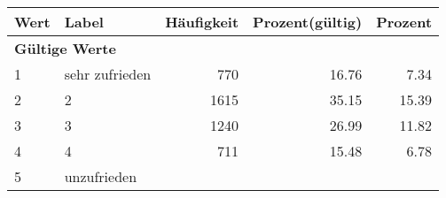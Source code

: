      \begin{longtable}{lXrrr}
     \toprule
     \textbf{Wert} & \textbf{Label} & \textbf{Häufigkeit} & \textbf{Prozent(gültig)} & \textbf{Prozent} \\
     \endhead
     \midrule
     \multicolumn{5}{l}{\textbf{Gültige Werte}}\\

     1 &
     \multicolumn{1}{X}{ sehr zufrieden   } &


       \num{770} &
       \num[round-mode=places,round-precision=2]{16.76} &
         \num[round-mode=places,round-precision=2]{7.34} \\

     2 &
     \multicolumn{1}{X}{ 2   } &


       \num{1615} &
       \num[round-mode=places,round-precision=2]{35.15} &
         \num[round-mode=places,round-precision=2]{15.39} \\

     3 &
     \multicolumn{1}{X}{ 3   } &


       \num{1240} &
       \num[round-mode=places,round-precision=2]{26.99} &
         \num[round-mode=places,round-precision=2]{11.82} \\

     4 &
     \multicolumn{1}{X}{ 4   } &


       \num{711} &
       \num[round-mode=places,round-precision=2]{15.48} &
         \num[round-mode=places,round-precision=2]{6.78} \\

     5 &
     \multicolumn{1}{X}{ unzufrieden   } &



\end{longtable}
